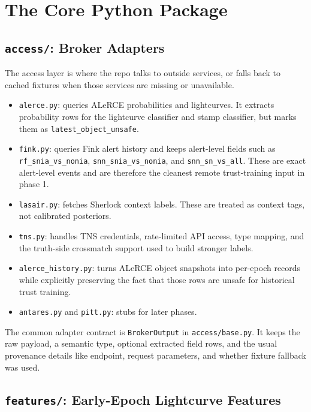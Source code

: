\documentclass[11pt]{article}
\newcommand{\code}[1]{\texttt{#1}}
\begin{document}
\section{The Core Python Package}

\subsection{\code{access/}: Broker Adapters}

The access layer is where the repo talks to outside services, or falls back to cached fixtures when those services are missing or unavailable.

\begin{itemize}
\item \code{alerce.py}: queries ALeRCE probabilities and lightcurves. It extracts probability rows for the lightcurve classifier and stamp classifier, but marks them as \code{latest\_object\_unsafe}.
\item \code{fink.py}: queries Fink alert history and keeps alert-level fields such as \code{rf\_snia\_vs\_nonia}, \code{snn\_snia\_vs\_nonia}, and \code{snn\_sn\_vs\_all}. These are exact alert-level events and are therefore the cleanest remote trust-training input in phase 1.
\item \code{lasair.py}: fetches Sherlock context labels. These are treated as context tags, not calibrated posteriors.
\item \code{tns.py}: handles TNS credentials, rate-limited API access, type mapping, and the truth-side crossmatch support used to build stronger labels.
\item \code{alerce\_history.py}: turns ALeRCE object snapshots into per-epoch records while explicitly preserving the fact that those rows are unsafe for historical trust training.
\item \code{antares.py} and \code{pitt.py}: stubs for later phases.
\end{itemize}

The common adapter contract is \code{BrokerOutput} in \code{access/base.py}. It keeps the raw payload, a semantic type, optional extracted field rows, and the usual provenance details like endpoint, request parameters, and whether fixture fallback was used.

\subsection{\code{features/}: Early-Epoch Lightcurve Features}
\end{document}
